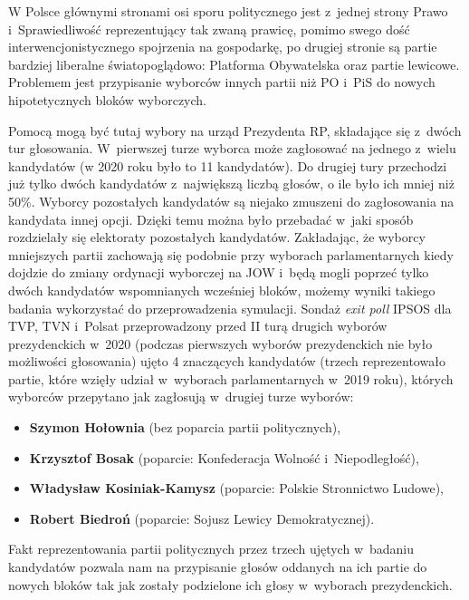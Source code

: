 W Polsce głównymi stronami osi sporu politycznego jest z~jednej strony Prawo i~Sprawiedliwość reprezentujący tak zwaną prawicę, pomimo swego dość interwencjonistycznego spojrzenia na gospodarkę, po drugiej stronie są partie bardziej liberalne światopoglądowo: Platforma Obywatelska oraz partie lewicowe. Problemem jest przypisanie wyborców innych partii niż PO i~PiS do nowych hipotetycznych bloków wyborczych.

Pomocą mogą być tutaj wybory na urząd Prezydenta RP, składające się z~dwóch tur głosowania. W~pierwszej turze wyborca może zagłosować na jednego z~wielu kandydatów (w 2020 roku było to 11 kandydatów). Do drugiej tury przechodzi już tylko dwóch kandydatów z~największą liczbą głosów, o ile było ich mniej niż 50\%. Wyborcy pozostałych kandydatów są niejako zmuszeni do zagłosowania na kandydata innej opcji. Dzięki temu można było przebadać w~jaki sposób rozdzielały się elektoraty pozostałych kandydatów. Zakładając, że wyborcy mniejszych partii zachowają się podobnie przy wyborach parlamentarnych kiedy dojdzie do zmiany ordynacji wyborczej na JOW i~będą mogli poprzeć tylko dwóch kandydatów wspomnianych wcześniej bloków, możemy wyniki takiego badania wykorzystać do przeprowadzenia symulacji.
\newpage
Sondaż \textit{exit poll} IPSOS dla TVP, TVN i~Polsat przeprowadzony przed II turą drugich wyborów prezydenckich w~2020 (podczas pierwszych wyborów prezydenckich nie było możliwości głosowania) ujęto 4 znaczących kandydatów (trzech reprezentowało partie, które wzięły udział w~wyborach parlamentarnych w~2019 roku), których wyborców przepytano jak zagłosują w~drugiej turze wyborów:
\begin{itemize}
    \item \textbf{Szymon Hołownia} (bez poparcia partii politycznych),
    \item \textbf{Krzysztof Bosak} (poparcie: Konfederacja Wolność i~Niepodległość),
    \item \textbf{Władysław Kosiniak-Kamysz} (poparcie: Polskie Stronnictwo Ludowe),
    \item \textbf{Robert Biedroń} (poparcie: Sojusz Lewicy Demokratycznej).
\end{itemize}

Fakt reprezentowania partii politycznych przez trzech ujętych w~badaniu kandydatów pozwala nam na przypisanie głosów oddanych na ich partie do nowych bloków tak jak zostały podzielone ich głosy w~wyborach prezydenckich.

